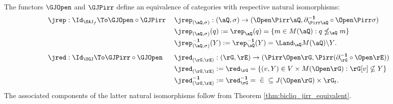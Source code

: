 \documentclass{article}
\begin{document}
\begin{theorem}
\label{thm:saj_f_equiv_ugj}
\item
The functors $\GJOpen$ and $\GJPirr$ define an equivalence of categories with respective natural isomorphisms:
\[
\begin{tabular}{lll}
$\jrep : \Id_{\SAJ_f} \To \GJOpen \circ \GJPirr$
& $\jrep_{(\aQ,\sigma)} : (\aQ,\sigma) \to (\Open\Pirr\aQ,\partial_{\Pirr\aQ}^{\bf-1} \circ \Open\Pirr\sigma )$
\\[1ex]&
$\jrep_{(\aQ,\sigma)}(q) := \rep_\aQ(q) = \{ m \in M(\aQ) : q \nleq_\aQ m \}$
\\[1ex]&
$\jrep_{(\aQ,\sigma)}^{\bf-1}(Y) := \rep_\aQ^{\bf-1}(Y) = \Land_\aQ M(\aQ) \backslash Y$.
\\[2ex]
$\jred : \Id_{\UGJ} \To \GJPirr \circ \GJOpen$
& $\jred_{(\rG,\rE)} : (\rG,\rE) \to  (\Pirr\Open\rG,\Pirr(\partial_\rG^{\bf-1} \circ \Open\rE))$
\\[1ex]&
$\jred_{(\rG,\rE)} := \red_\rG = \{ (v,Y) \in V \times M(\Open\rG) :  \rG[v] \nsubseteq Y \}$
\\[1ex]&
$\jred_{(\rG,\rE)}^{\bf-1} := \red_\rG^{\bf-1} = \; \breve{\in} \; \subseteq J(\Open\rG) \times \rG_t$.
\end{tabular}
\]
The associated components of the latter natural isomorphisms follow from Theorem \ref{thm:bicliq_jirr_equivalent}.
\end{theorem}
\end{document}
